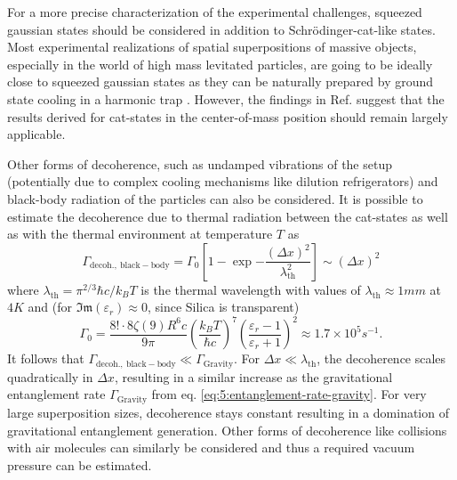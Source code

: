 For a more precise characterization of the experimental challenges, squeezed gaussian states \cite[p. 33-64]{Serafini_2017} should be considered in addition to Schrödinger-cat-like states.
Most experimental realizations of spatial superpositions of massive objects, especially in the world of high mass levitated particles, are going to be ideally close to squeezed gaussian states \cite[Timestamp: 23:00]{Aspelmeyer_2024} as they can be naturally prepared by ground state cooling in a harmonic trap \cite{Weiss_2021}.
However, the findings in Ref. \cite{Pedernales_2023} suggest that the results derived for cat-states in the center-of-mass position should remain largely applicable.

Other forms of decoherence, such as undamped vibrations of the setup (potentially due to complex cooling mechanisms like dilution refrigerators) and black-body radiation of the particles can also be considered.
It is possible to estimate the decoherence due to thermal radiation \cite[p. 127-136]{Schlosshauer_2007} between the cat-states as well as with the thermal environment at temperature $T$ as \cite{RomeroIsart_2011}
\begin{equation}
  \Gamma_\mathrm{decoh.,\ black-body} = \Gamma_0\left[1 - \exp{-\frac{(\Delta x)^2}{\lambda^2_\mathrm{th}}}\right] \sim (\Delta x)^2
\end{equation}
where $\lambda_\mathrm{th} = \pi^{2/3} \hbar c / k_B T$ is the thermal wavelength with values of $\lambda_\mathrm{th} \approx 1\si{mm}$ at $4\si{K}$ and (for $\mathfrak{Im}(\varepsilon_r)\approx 0$, since Silica is transparent)
\begin{equation}
  \Gamma_0 = \frac{8! \cdot 8 \zeta(9)R^6c}{9\pi} \left(\frac{k_B T}{\hbar c}\right)^7 \left(\frac{\varepsilon_r - 1}{\varepsilon_r + 1}\right)^2 \approx 1.7 \times 10^{5} \si{s^{-1}} .
\end{equation}
It follows that $\Gamma_\mathrm{decoh.,\ black-body} \ll \Gamma_\mathrm{Gravity}$.
For $\Delta x \ll \lambda_\mathrm{th}$, the decoherence scales quadratically in $\Delta x$, resulting in a similar increase as the gravitational entanglement rate $\Gamma_\mathrm{Gravity}$ from eq. \eqref{eq:5:entanglement-rate-gravity}.
For very large superposition sizes, decoherence stays constant resulting in a domination of gravitational entanglement generation.
Other forms of decoherence like collisions with air molecules can similarly be considered and thus a required vacuum pressure can be estimated.

